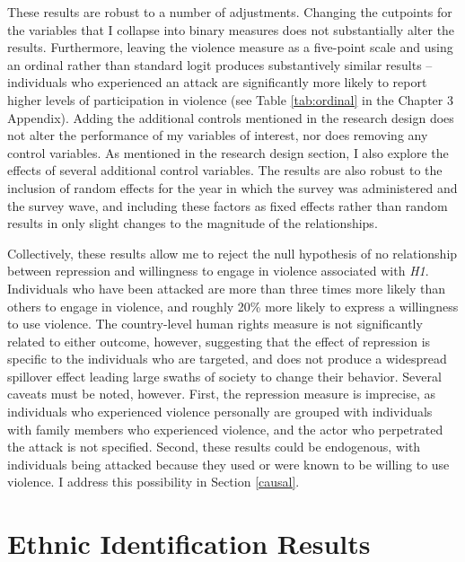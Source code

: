 \documentclass[12pt,]{book}
\theoremstyle{definition}
\theoremstyle{definition}
\theoremstyle{definition}
\theoremstyle{remark}
\begin{document}
These results are robust to a number of adjustments. Changing the
cutpoints for the variables that I collapse into binary measures does
not substantially alter the results. Furthermore, leaving the violence
measure as a five-point scale and using an ordinal rather than standard
logit produces substantively similar results -- individuals who
experienced an attack are significantly more likely to report higher
levels of participation in violence (see Table \ref{tab:ordinal} in the
Chapter 3 Appendix). Adding the additional controls mentioned in the
research design does not alter the performance of my variables of
interest, nor does removing any control variables. As mentioned in the
research design section, I also explore the effects of several
additional control variables. The results are also robust to the
inclusion of random effects for the year in which the survey was
administered and the survey wave, and including these factors as fixed
effects rather than random results in only slight changes to the
magnitude of the relationships.

Collectively, these results allow me to reject the null hypothesis of no
relationship between repression and willingness to engage in violence
associated with \emph{H1}. Individuals who have been attacked are more
than three times more likely than others to engage in violence, and
roughly 20\% more likely to express a willingness to use violence. The
country-level human rights measure is not significantly related to
either outcome, however, suggesting that the effect of repression is
specific to the individuals who are targeted, and does not produce a
widespread spillover effect leading large swaths of society to change
their behavior. Several caveats must be noted, however. First, the
repression measure is imprecise, as individuals who experienced violence
personally are grouped with individuals with family members who
experienced violence, and the actor who perpetrated the attack is not
specified. Second, these results could be endogenous, with individuals
being attacked because they used or were known to be willing to use
violence. I address this possibility in Section \ref{causal}.

\hypertarget{ethnic-identification-results}{%
\section{Ethnic Identification
Results}\label{ethnic-identification-results}}
\end{document}
